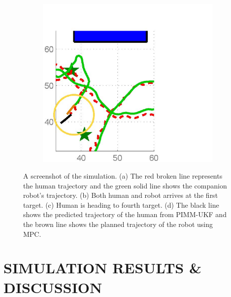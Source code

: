 \documentclass[journal]{IEEEtran}
\newcommand{\todonote}[1]{\vspace{0px} %
	\todo[inline, color=green!30]{\textbf{[Note:]} {#1}} %
}
\DeclareRobustCommand{\dhnote}[1]{\ifthenelse{\boolean{include-notes}}%
{\textcolor{blue}{\textbf{DH: #1}}}{}}
\DeclareRobustCommand{\grnote}[1]{\ifthenelse{\boolean{include-notes}}%
{\textcolor{purple}{\textbf{GR: #1}}}{}}
\begin{document}
\begin{figure}
\begin{subfigure}{0.23\textwidth}
			\caption{}
			\label{fig:ref_traj_obs2}
		\end{subfigure}
		~
		\begin{subfigure}{0.23\textwidth}
			\includegraphics[width=1.05\textwidth]{figures/044}
			\caption{}
			\label{fig:ref_traj_accom}
		\end{subfigure}
		\caption{A screenshot of the simulation. (a) The red broken line represents the human trajectory and the green solid line shows the companion robot's trajectory. (b) Both human and robot arrives at the first target. (c) Human is heading to fourth target. (d) The black line shows the predicted trajectory of the human from PIMM-UKF and the brown line shows the planned trajectory of the robot using MPC.}
	\end{figure}		
    

	\section{SIMULATION RESULTS \& DISCUSSION}\label{sec:results}
    
\end{document}
